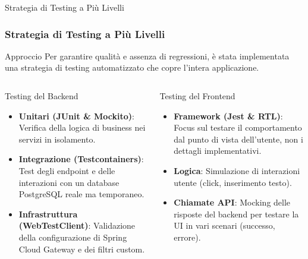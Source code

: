 \documentclass[8pt]{beamer}
\begin{document}

\begin{frame}{Strategia di Testing a Più Livelli}
  \frametitle{Strategia di Testing a Più Livelli}

  \begin{block}{Approccio}
    Per garantire qualità e assenza di regressioni, è stata implementata una strategia di testing automatizzato che copre l'intera applicazione.
  \end{block}

  \begin{columns}[T]
    \begin{exampleblock}{Testing del Backend}
      \begin{itemize}
        \item \textbf{Unitari (JUnit \& Mockito)}: Verifica della logica di business nei servizi in isolamento.
        \item \textbf{Integrazione (Testcontainers)}: Test degli endpoint e delle interazioni con un database PostgreSQL reale ma temporaneo.
        \item \textbf{Infrastruttura (WebTestClient)}: Validazione della configurazione di Spring Cloud Gateway e dei filtri custom.
      \end{itemize}
    \end{exampleblock}

    \begin{exampleblock}{Testing del Frontend}
      \begin{itemize}
        \item \textbf{Framework (Jest \& RTL)}: Focus sul testare il comportamento dal punto di vista dell'utente, non i dettagli implementativi.
        \item \textbf{Logica}: Simulazione di interazioni utente (click, inserimento testo).
        \item \textbf{Chiamate API}: Mocking delle risposte del backend per testare la UI in vari scenari (successo, errore).
      \end{itemize}
    \end{exampleblock}
  \end{columns}
\end{frame}
\end{document}
